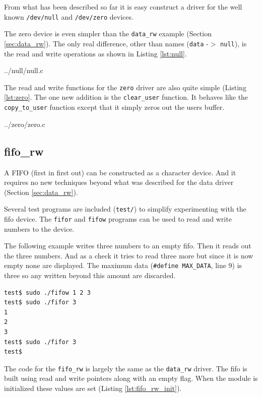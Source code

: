 \documentclass{article}
\begin{document}
From what has been described so far it is easy construct a driver
for the well known \verb+/dev/null+ and \verb+/dev/zero+ devices.

The zero device is even simpler than the \verb+data_rw+ example
(Section \ref{sec:data_rw}).
The only real difference, other than names (\verb+data+ -$>$ \verb+null+),
is the read and write operations as shown in Listing \ref{lst:null}.


	{../null/null.c}

The read and write functions for the \verb+zero+ driver are also quite
simple (Listing \ref{lst:zero}.
The one new addition is the \verb+clear_user+ function.
It behaves like the \verb+copy_to_user+ function except that it simply
zeros out the users buffer.


	{../zero/zero.c}


\subsection{fifo\_rw}

A FIFO (first in first out) can be constructed as a character device.
And it requires no new techniques beyond what was described for
the data driver (Section \ref{sec:data_rw}).

Several test programs are included (\verb+test/+) to simplify
experimenting with the fifo device.
The \verb+fifor+ and \verb+fifow+ programs can
be used to read and write numbers to the device.

The following example writes three numbers to an empty fifo.
Then it reads out the three numbers.  And as a check it tries
to read three more but since it is now empty none are displayed.
The maximum data (\verb+#define MAX_DATA+, line 9) is three so
any written beyond this amount are discarded.

\begin{verbatim}
test$ sudo ./fifow 1 2 3
test$ sudo ./fifor 3
1
2
3
test$ sudo ./fifor 3
test$
\end{verbatim}

The code for the \verb+fifo_rw+ is largely the same as the \verb+data_rw+
driver.
The fifo is built using read and write pointers along with an empty flag.
When the module is initialized these values are
set (Listing \ref{lst:fifo_rw_init}).
\end{document}
